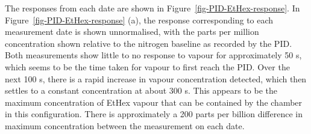 \documentclass[
  a4paper,
]{scrbook}
\begin{document}
The responses from each date are shown in
Figure~\ref{fig-PID-EtHex-response}. In
Figure~\ref{fig-PID-EtHex-response} (a), the response corresponding to
each measurement date is shown unnormalised, with the parts per million
concentration shown relative to the nitrogen baseline as recorded by the
PID. Both measurements show little to no response to vapour for
approximately 50 s, which seems to be the time taken for vapour to first
reach the PID. Over the next 100 s, there is a rapid increase in vapour
concentration detected, which then settles to a constant concentration
at about 300 s. This appears to be the maximum concentration of EtHex
vapour that can be contained by the chamber in this configuration. There
is approximately a 200 parts per billion difference in maximum
concentration between the measurement on each date.
\end{document}
